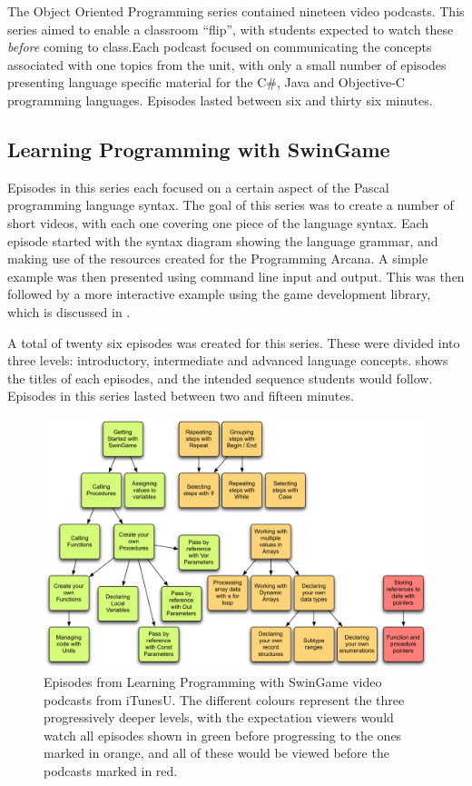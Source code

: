 The Object Oriented Programming series contained nineteen video podcasts. This series aimed to enable a classroom ``flip'', with students expected to watch these \emph{before} coming to class.Each podcast focused on communicating the concepts associated with one topics from the unit, with only a small number of episodes presenting language specific material for the C\#, Java and Objective-C programming languages. Episodes lasted between six and thirty six minutes.


\subsection{Learning Programming with SwinGame} %
\label{sub:learning_programming_with_swingame}

Episodes in this series each focused on a certain aspect of the Pascal programming language syntax. The goal of this series was to create a number of short videos, with each one covering one piece of the language syntax. Each episode started with the syntax diagram showing the language grammar, and making use of the resources created for the Programming Arcana. A simple example was then presented using command line input and output. This was then followed by a more interactive example using the game development library, which is discussed in .

A total of twenty six episodes was created for this series. These were divided into three levels: introductory, intermediate and advanced language concepts.  shows the titles of each episodes, and the intended sequence students would follow. Episodes in this series lasted between two and fifteen minutes.

\begin{figure}[thb]
  \centering
  \includegraphics[width=\textwidth]{PodCasts1}
  \caption{Episodes from Learning Programming with SwinGame video podcasts from iTunesU. The different colours represent the three progressively deeper levels, with the expectation viewers would watch all episodes shown in green before progressing to the ones marked in orange, and all of these would be viewed before the podcasts marked in red.}
  \label{fig:podcasts}
\end{figure}

